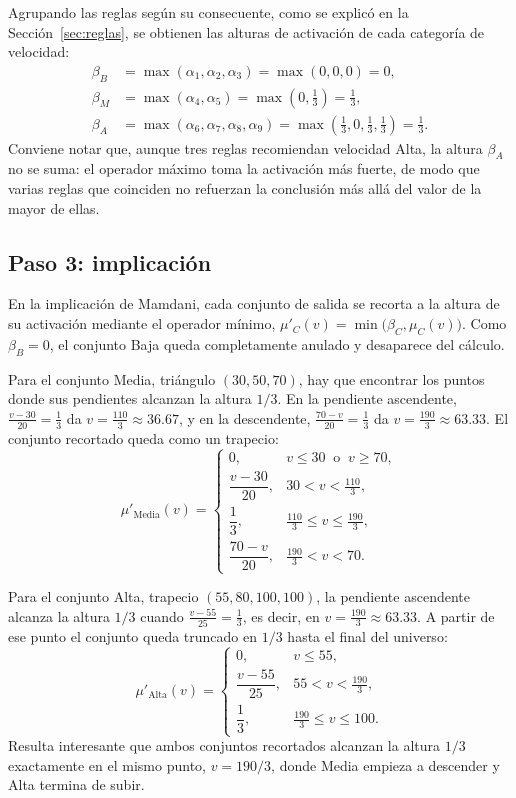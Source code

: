 \documentclass[11pt]{article}
\begin{document}
Agrupando las reglas según su consecuente, como se explicó en la Sección~\ref{sec:reglas}, se obtienen las alturas de activación de cada categoría de velocidad:
\begin{align*}
\beta_B &= \max(\alpha_1, \alpha_2, \alpha_3) = \max(0, 0, 0) = 0, \\
\beta_M &= \max(\alpha_4, \alpha_5) = \max\left(0, \tfrac{1}{3}\right) = \tfrac{1}{3}, \\
\beta_A &= \max(\alpha_6, \alpha_7, \alpha_8, \alpha_9) = \max\left(\tfrac{1}{3}, 0, \tfrac{1}{3}, \tfrac{1}{3}\right) = \tfrac{1}{3}.
\end{align*}
Conviene notar que, aunque tres reglas recomiendan velocidad Alta, la altura $\beta_A$ no se suma: el operador máximo toma la activación más fuerte, de modo que varias reglas que coinciden no refuerzan la conclusión más allá del valor de la mayor de ellas.

\subsection{Paso 3: implicación}

En la implicación de Mamdani, cada conjunto de salida se recorta a la altura de su activación mediante el operador mínimo, $\mu'_C(v) = \min\bigl(\beta_C, \mu_C(v)\bigr)$. Como $\beta_B = 0$, el conjunto Baja queda completamente anulado y desaparece del cálculo.

Para el conjunto Media, triángulo $(30, 50, 70)$, hay que encontrar los puntos donde sus pendientes alcanzan la altura $1/3$. En la pendiente ascendente, $\frac{v - 30}{20} = \frac{1}{3}$ da $v = \frac{110}{3} \approx 36.67$, y en la descendente, $\frac{70 - v}{20} = \frac{1}{3}$ da $v = \frac{190}{3} \approx 63.33$. El conjunto recortado queda como un trapecio:
\[
\mu'_{\text{Media}}(v) =
\begin{cases}
0, & v \le 30 \ \text{ o } \ v \ge 70, \\[4pt]
\dfrac{v - 30}{20}, & 30 < v < \frac{110}{3}, \\[8pt]
\dfrac{1}{3}, & \frac{110}{3} \le v \le \frac{190}{3}, \\[8pt]
\dfrac{70 - v}{20}, & \frac{190}{3} < v < 70.
\end{cases}
\]

Para el conjunto Alta, trapecio $(55, 80, 100, 100)$, la pendiente ascendente alcanza la altura $1/3$ cuando $\frac{v - 55}{25} = \frac{1}{3}$, es decir, en $v = \frac{190}{3} \approx 63.33$. A partir de ese punto el conjunto queda truncado en $1/3$ hasta el final del universo:
\[
\mu'_{\text{Alta}}(v) =
\begin{cases}
0, & v \le 55, \\[4pt]
\dfrac{v - 55}{25}, & 55 < v < \frac{190}{3}, \\[8pt]
\dfrac{1}{3}, & \frac{190}{3} \le v \le 100.
\end{cases}
\]
Resulta interesante que ambos conjuntos recortados alcanzan la altura $1/3$ exactamente en el mismo punto, $v = 190/3$, donde Media empieza a descender y Alta termina de subir.
\end{document}
